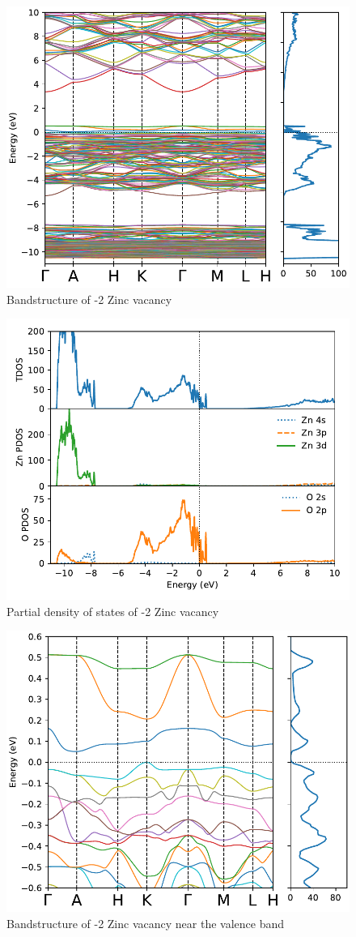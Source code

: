 \begin{figure}[tbh!]
	\centering
	\includegraphics[width=0.6\linewidth]{"images/rnd/band-dos_Zn_vac-n2"}
	\caption[Bandstructure of -2 Zinc vacancy]{Bandstructure of -2 Zinc vacancy}
\end{figure}

\begin{figure}[tbh!]
	\centering
	\includegraphics[width=0.6\linewidth]{"images/rnd/dos-pdos_Zn_vac-n2"}
	\caption[Partial density of states of -2 Zinc vacancy]{Partial density of states of -2 Zinc vacancy}
\end{figure}

\begin{figure}[tbh!]
	\centering
	\includegraphics[width=0.6\linewidth]{"images/rnd/band-dos-close_Zn_vac-n2"}
	\caption[Bandstructure of -2 Zinc vacancy near the valence band]{Bandstructure of -2 Zinc vacancy near the valence band}
\end{figure}

